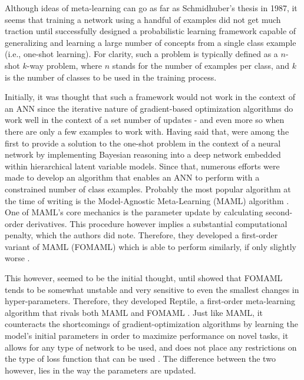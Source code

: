 \documentclass[a4paper]{book}
\begin{document}
Although ideas of meta-learning can go as far as Schmidhuber's thesis in 1987, it seems that training a network using a handful of examples did not get much traction until \textcite{lake_human-level_2015} successfully designed a probabilistic learning framework capable of generalizing and learning a large number of concepts from a single class example (i.e., one-shot learning). For clarity, such a problem is typically defined as a $n$-shot $k$-way problem, where $n$ stands for the number of examples per class, and $k$ is the number of classes to be used in the training process.

Initially, it was thought that such a framework would not work in the context of an ANN since the iterative nature of gradient-based optimization algorithms do work well in the context of a set number of updates \parencite{ravi_optimization_2016} - and even more so when there are only a few examples to work with. Having said that, \textcite{rezende_one-shot_2016} were among the first to provide a solution to the one-shot problem in the context of a neural network by implementing Bayesian reasoning into a deep network embedded within hierarchical latent variable models. Since that, numerous efforts were made to develop an algorithm that enables an ANN to perform with a constrained number of class examples. Probably the most popular algorithm at the time of writing is the Model-Agnostic Meta-Learning (MAML) algorithm \parencite{finn_model-agnostic_2017}. One of MAML's core mechanics is the parameter update by calculating second-order derivatives. This procedure however implies a substantial computational penalty, which the authors did note. Therefore, they developed a first-order variant of MAML (FOMAML) which is able to perform similarly, if only slightly worse \parencite{finn_model-agnostic_2017}.

This however, seemed to be the initial thought, until \textcite{nichol_first-order_2018} showed that FOMAML tends to be somewhat unstable and very sensitive to even the smallest changes in hyper-parameters. Therefore, they developed Reptile, a first-order meta-learning algorithm that rivals both MAML and FOMAML \parencite{nichol_first-order_2018}. Just like MAML, it counteracts the shortcomings of gradient-optimization algorithms by learning the model's initial parameters in order to maximize performance on novel tasks, it allows for any type of network to be used, and does not place any restrictions on the type of loss function that can be used \parencite{nichol_first-order_2018}. The difference between the two however, lies in the way the parameters are updated. 
\end{document}

